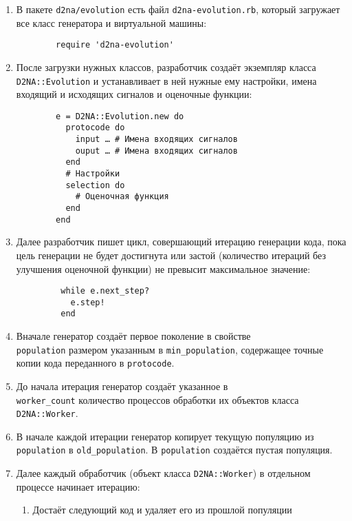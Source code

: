 \documentclass[utf8,a5paper,portrait,10pt,twoside]{eskdtext}
\begin{document}
\begin{enumerate}
  \item В пакете \texttt{d2na/evolution} есть файл \texttt{d2na-evolution.rb},
        который загружает все класс генератора и виртуальной машины:
        \begin{verbatim}
        require 'd2na-evolution'
        \end{verbatim}
  \item После загрузки нужных классов, разработчик создаёт экземпляр класса
        \texttt{D2NA::Evolution} и устанавливает в ней нужные ему настройки,
        имена входящий и исходящих сигналов и оценочные функции:
        \begin{verbatim}
        e = D2NA::Evolution.new do
          protocode do
            input … # Имена входящих сигналов
            ouput … # Имена входящих сигналов
          end
          # Настройки
          selection do
            # Оценочная функция
          end
        end
        \end{verbatim}
   \newpage
   \item Далее разработчик пишет цикл, совершающий итерацию генерации кода,
         пока цель генерации не будет достигнута или застой (количество
         итераций без улучшения оценочной функции) не превысит максимальное
         значение:
         \begin{verbatim}
         while e.next_step?
           e.step!
         end
         \end{verbatim}
  \item Вначале генератор создаёт первое поколение в свойстве\\
        \texttt{population} размером указанным в \texttt{min\_population},
        содержащее точные копии кода переданного в \texttt{protocode}.
  \item До начала итерация генератор создаёт указанное в\\
        \texttt{worker\_count} количество процессов обработки их объектов класса
        \texttt{D2NA::Worker}.
  \item В начале каждой итерации генератор копирует текущую популяцию из
        \texttt{population} в \texttt{old\_population}. В \texttt{population}
        создаётся пустая популяция.
  \item Далее каждый обработчик (объект класса \texttt{D2NA::Worker}) в
        отдельном процессе начинает итерацию:
        \begin{enumerate}
          \item Достаёт следующий код и удаляет его из прошлой популяции\\

\end{enumerate}
\end{enumerate}
\end{document}

